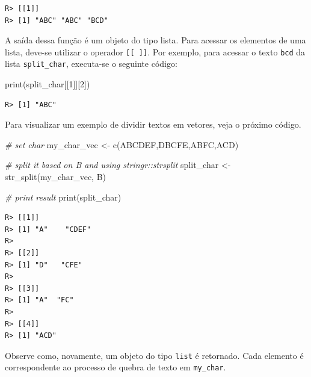 \documentclass[
  11pt,
]{book}
\newenvironment{Shaded}{\begin{snugshade}}{\end{snugshade}}
\newcommand{\CommentTok}[1]{\textcolor[rgb]{0.37,0.37,0.37}{\textit{#1}}}
\newcommand{\DecValTok}[1]{\textcolor[rgb]{0.06,0.06,0.06}{#1}}
\newcommand{\FunctionTok}[1]{\textcolor[rgb]{0,0,0}{#1}}
\newcommand{\NormalTok}[1]{#1}
\newcommand{\OtherTok}[1]{\textcolor[rgb]{0.37,0.37,0.37}{#1}}
\newcommand{\StringTok}[1]{\textcolor[rgb]{0.5,0.5,0.5}{#1}}
\begin{document}
\begin{verbatim}
R> [[1]]
R> [1] "ABC" "ABC" "BCD"
\end{verbatim}

A saída dessa função é um objeto do tipo lista. Para acessar os elementos de uma lista, deve-se utilizar o operador \texttt{{[}{[}\ {]}{]}}. Por exemplo, para acessar o texto \texttt{bcd} da lista \texttt{split\_char}, executa-se o seguinte código:

\begin{Shaded}
\begin{Highlighting}[]
\FunctionTok{print}\NormalTok{(split\_char[[}\DecValTok{1}\NormalTok{]][}\DecValTok{2}\NormalTok{])}
\end{Highlighting}
\end{Shaded}

\begin{verbatim}
R> [1] "ABC"
\end{verbatim}

Para visualizar um exemplo de dividir textos em vetores, veja o próximo código.

\begin{Shaded}
\begin{Highlighting}[]
\CommentTok{\# set char}
\NormalTok{my\_char\_vec }\OtherTok{\textless{}{-}} \FunctionTok{c}\NormalTok{(}\StringTok{\textquotesingle{}ABCDEF\textquotesingle{}}\NormalTok{,}\StringTok{\textquotesingle{}DBCFE\textquotesingle{}}\NormalTok{,}\StringTok{\textquotesingle{}ABFC\textquotesingle{}}\NormalTok{,}\StringTok{\textquotesingle{}ACD\textquotesingle{}}\NormalTok{)}

\CommentTok{\# split it based on \textquotesingle{}B\textquotesingle{} and using stringr::strsplit}
\NormalTok{split\_char }\OtherTok{\textless{}{-}} \FunctionTok{str\_split}\NormalTok{(my\_char\_vec, }\StringTok{\textquotesingle{}B\textquotesingle{}}\NormalTok{)}

\CommentTok{\# print result}
\FunctionTok{print}\NormalTok{(split\_char)}
\end{Highlighting}
\end{Shaded}

\begin{verbatim}
R> [[1]]
R> [1] "A"    "CDEF"
R> 
R> [[2]]
R> [1] "D"   "CFE"
R> 
R> [[3]]
R> [1] "A"  "FC"
R> 
R> [[4]]
R> [1] "ACD"
\end{verbatim}

Observe como, novamente, um objeto do tipo \texttt{list} é retornado. Cada elemento é correspondente ao processo de quebra de texto em \texttt{my\_char}.
\end{document}
